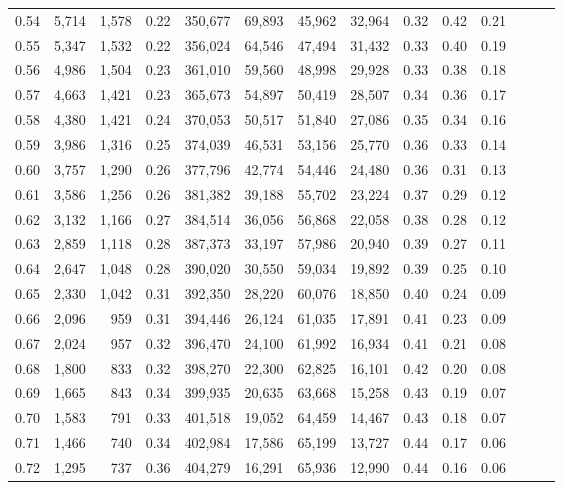 \begin{tabular}{rrrrrrrrrrrrrr}
0.54 &  5,714 &  1,578 &  0.22 &  350,677 &   69,893 &  45,962 &  32,964 &  0.32 &  0.42 &      0.21 \\
0.55 &  5,347 &  1,532 &  0.22 &  356,024 &   64,546 &  47,494 &  31,432 &  0.33 &  0.40 &      0.19 \\
0.56 &  4,986 &  1,504 &  0.23 &  361,010 &   59,560 &  48,998 &  29,928 &  0.33 &  0.38 &      0.18 \\
0.57 &  4,663 &  1,421 &  0.23 &  365,673 &   54,897 &  50,419 &  28,507 &  0.34 &  0.36 &      0.17 \\
0.58 &  4,380 &  1,421 &  0.24 &  370,053 &   50,517 &  51,840 &  27,086 &  0.35 &  0.34 &      0.16 \\
0.59 &  3,986 &  1,316 &  0.25 &  374,039 &   46,531 &  53,156 &  25,770 &  0.36 &  0.33 &      0.14 \\
0.60 &  3,757 &  1,290 &  0.26 &  377,796 &   42,774 &  54,446 &  24,480 &  0.36 &  0.31 &      0.13 \\
0.61 &  3,586 &  1,256 &  0.26 &  381,382 &   39,188 &  55,702 &  23,224 &  0.37 &  0.29 &      0.12 \\
0.62 &  3,132 &  1,166 &  0.27 &  384,514 &   36,056 &  56,868 &  22,058 &  0.38 &  0.28 &      0.12 \\
0.63 &  2,859 &  1,118 &  0.28 &  387,373 &   33,197 &  57,986 &  20,940 &  0.39 &  0.27 &      0.11 \\
0.64 &  2,647 &  1,048 &  0.28 &  390,020 &   30,550 &  59,034 &  19,892 &  0.39 &  0.25 &      0.10 \\
0.65 &  2,330 &  1,042 &  0.31 &  392,350 &   28,220 &  60,076 &  18,850 &  0.40 &  0.24 &      0.09 \\
0.66 &  2,096 &    959 &  0.31 &  394,446 &   26,124 &  61,035 &  17,891 &  0.41 &  0.23 &      0.09 \\
0.67 &  2,024 &    957 &  0.32 &  396,470 &   24,100 &  61,992 &  16,934 &  0.41 &  0.21 &      0.08 \\
0.68 &  1,800 &    833 &  0.32 &  398,270 &   22,300 &  62,825 &  16,101 &  0.42 &  0.20 &      0.08 \\
0.69 &  1,665 &    843 &  0.34 &  399,935 &   20,635 &  63,668 &  15,258 &  0.43 &  0.19 &      0.07 \\
0.70 &  1,583 &    791 &  0.33 &  401,518 &   19,052 &  64,459 &  14,467 &  0.43 &  0.18 &      0.07 \\
0.71 &  1,466 &    740 &  0.34 &  402,984 &   17,586 &  65,199 &  13,727 &  0.44 &  0.17 &      0.06 \\
0.72 &  1,295 &    737 &  0.36 &  404,279 &   16,291 &  65,936 &  12,990 &  0.44 &  0.16 &      0.06 \\

\end{tabular}
